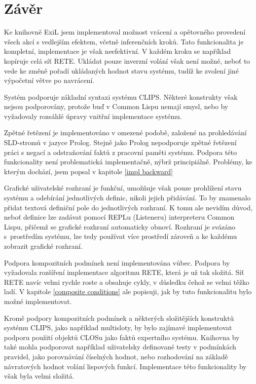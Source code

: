 \section{Závěr}

Ke knihovně ExiL jsem implementoval možnost vrácení a opětovného provedení všech
akcí s vedlejším efektem, včetně inferenčních kroků. Tato funkcionalita je
kompletní, implementace je však neefektivní. V každém kroku se například
kopíruje celá síť RETE. Ukládat pouze inverzní volání však není možné, neboť to
vede ke změně pořadí ukládaných hodnot stavu systému, tudíž ke zvolení jiné
výpočetní větve po navrácení.

Systém podporuje základní syntaxi systému CLIPS. Některé konstrukty však nejsou
podporovány, protože buď v Common Lispu nemají smysl, nebo by vyžadovaly rozsáhlé
úpravy vnitřní implementace systému.

Zpětné řetězení je implementováno v omezené podobě, založené na prohledávání
SLD-stromů v jazyce Prolog. Stejně jako Prolog nepodporuje zpětné řetězení práci
s negací a odstraňování faktů z pracovní paměti systému. Podpora této
funkcionality není problematická implementačně, nýbrž principiálně. Problémy, ke
kterým dochází, jsem popsal v kapitole \ref{impl backward}

Grafické uživatelské rozhraní je funkční, umožňuje však pouze prohlížení stavu
systému a odebírání jednotlivých definic, nikoli jejich přidávání. To by
znamenalo přidat textová definiční pole do jednotlivých rozhraní. K tomu ale
nevidím důvod, neboť definice lze zadávat pomocí REPLu (Listeneru) interpreteru
Common Lispu, přičemž se grafické rozhraní automaticky obnoví. Rozhraní je
svázáno s~prostředím systému, lze tedy používat více prostředí zároveň a ke
každému zobrazit grafické rozhraní.

Podpora kompozitních podmínek není implementována vůbec. Podpora by
vyžadovala rozšíření implementace algoritmu RETE, která je už tak složitá. Síť
RETE navíc velmi rychle roste a obsahuje cykly, v důsledku čehož se velmi těžko
ladí. V kapitole \ref{composite conditions} ale popisuji, jak by tuto
funkcionalitu bylo možné implementovat.

Kromě podpory kompozitních podmínek a některých složitějších konstruktů systému
CLIPS, jako například multisloty, by bylo zajímavé implementovat podporu
použití objektů CLOSu jako faktů expertního systému. Knihovna by také mohla
podporovat například uživatelsky definované testy v podmínkách pravidel, jako
porovnávání číselných hodnot, nebo rozhodování na základě návratových hodnot
volání lispových funkcí. Implementace této funkcionality by však byla velmi
složitá.

